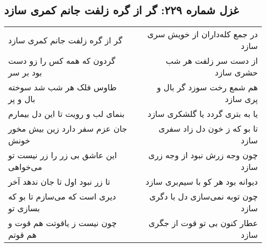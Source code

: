 \begin{center}
\section*{غزل شماره ۲۲۹: گر از گره زلفت جانم کمری سازد}
\label{sec:229}
\begin{longtable}{l p{0.5cm} r}
گر از گره زلفت جانم کمری سازد
&&
در جمع کله‌داران از خویش سری سازد
\\
گردون که همه کس را زو دست بود بر سر
&&
از دست سر زلفت هر شب حشری سازد
\\
طاوس فلک هر شب شد سوخته بال و پر
&&
هم شمع رخت سوزد گر بال و پری سازد
\\
بنمای لب و رویت تا این دل بیمارم
&&
یا به بتری گردد یا گلشکری سازد
\\
جان عزم سفر دارد زین بیش مخور خونش
&&
تا بو که ز خون دل زاد سفری سازد
\\
این عاشق بی زر را زر نیست تو می‌خواهی
&&
چون وجه زرش نبود از وجه زری سازد
\\
تا زر نبود اول تا جان ندهد آخر
&&
دیوانه بود هر کو با سیم‌بری سازد
\\
دیری است که می‌سازم تا بو که بسازی تو
&&
چون توبه نمی‌سازی دل با دگری سازد
\\
چون نیست ز یاقوتت هم قوت و هم قوتم
&&
عطار کنون بی تو قوت از جگری سازد
\\
\end{longtable}
\end{center}

